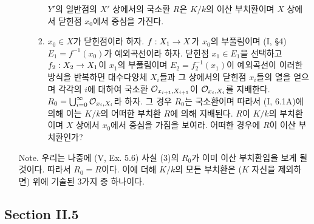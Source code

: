 \begin{enumerate}[label=\tb{4.\arabic*.},itemindent=0mm,itemsep=4mm]
\begin{enumerate}[label=(\alph*)]
\begin{enumerate}[label=(\arabic*)]
	$Y'$의 일반점의 $X'$ 상에서의 국소환 $R$은 $K/k$의 이산 부치환이며 $X$ 상에서 닫힌점 $x_0$에서 중심을 가진다.
	\item $x_0\in X$가 닫힌점이라 하자. $f:X_1\rightarrow X$가 $x_0$의 부풀림이며 (I, \S 4) $E_1=f^{-1}(x_0)$가 예외곡선이라 하자.
	닫힌점 $x_1\in E_1$을 선택하고 $f_2:X_2\rightarrow X_1$이 $x_1$의 부풀림이며 $E_2=f_2^{-1}(x_1)$이 예외곡선이
	이러한 방식을 반복하면 대수다양체 $X_i$들과 그 상에서의 닫힌점 $x_i$들의 열을 얻으며
	각각의 $i$에 대하여 국소환 $\mathcal{O}_{x_{i+1},X_{i+1}}$이 $\mathcal{O}_{x_i,X_i}$를 지배한다.
	$R_0=\bigcup_{i=0}^\infty\mathcal{O}_{x_i,X_i}$라 하자. 그 경우 $R_0$는 국소환이며
	따라서 (I, 6.1A)에 의해 이는 $K/k$의 어떠한 부치환 $R$에 의해 지배된다.
	$R$이 $K/k$의 부치환이며 $X$ 상에서 $x_0$에서 중심을 가짐을 보여라. 어떠한 경우에 $R$이 이산 부치환인가?
	\end{enumerate}
	\end{enumerate}
	Note. 우리는 나중에 (V, Ex. 5.6) 사실 (3)의 $R_0$가 이미 이산 부치환임을 보게 될 것이다. 따라서 $R_0=R$이다.
	이에 더해 $K/k$의 모든 부치환은 ($K$ 자신을 제외하면) 위에 기술된 3가지 중 하나이다.\\
	\sol
	\end{enumerate}

	
	\subsection*{Section II.5}
	
